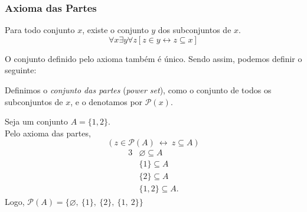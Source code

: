       \subsubsection{Axioma das Partes} 
         \begin{stat}
            Para todo conjunto $x$, existe o conjunto $y$ dos subconjuntos de $x$.
            $$\forall x \exists y \forall z [z \in y \leftrightarrow z \subseteq x]$$
         \end{stat}
         O conjunto definido pelo axioma também é único. Sendo assim, podemos definir o seguinte:
         \begin{definition}
            Definimos o \emph{conjunto das partes} (\emph{power set}), como o conjunto de todos os subconjuntos de $x$, e o denotamos por $\mathcal{P}(x)$.
         \end{definition}
         \begin{exmp}
            Seja um conjunto $A = \{1,2\}.$\\
            Pelo axioma das partes, $$(z \in  \mathcal{P}(A)\ \leftrightarrow\ z \subseteq A)$$
            \begin{alignat*}{3}
               & \varnothing \subseteq A\\
               & \{1\} \subseteq A\\
               & \{2\} \subseteq A\\
               & \{1,2\} \subseteq A.
            \end{alignat*}
            Logo, $\mathcal{P}(A) = \{\varnothing,\ \{1\},\ \{2\},\ \{1,\ 2\}\}$
         \end{exmp}

